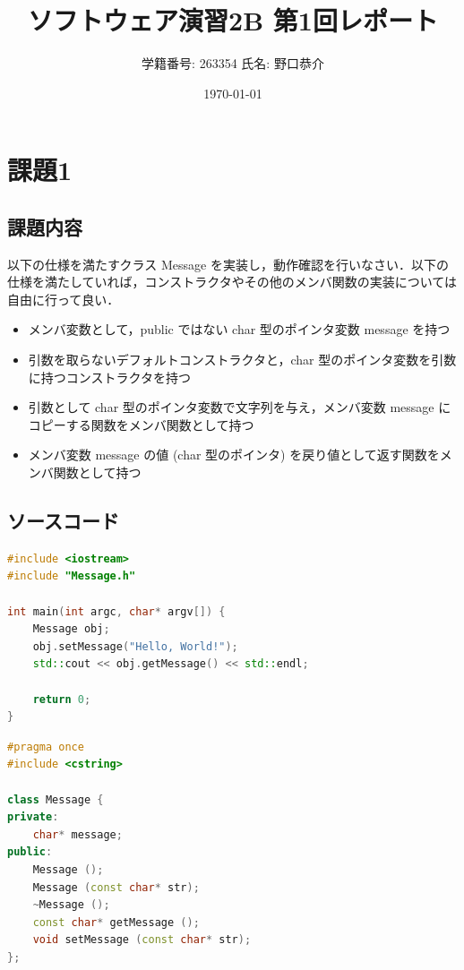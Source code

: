 \documentclass[paper=a4,fontsize=11pt]{jlreq}
\title{ソフトウェア演習2B 第1回レポート}
\author{学籍番号: 263354 \quad 氏名: 野口恭介}
\date{\today}
\begin{document}
\maketitle

\section{課題1}
\subsection{課題内容}
以下の仕様を満たすクラス Message を実装し，動作確認を行いなさい．以下の仕様を満たしていれば，コンストラクタやその他のメンバ関数の実装については自由に行って良い． %

\begin{itemize}
    \item メンバ変数として，public ではない char 型のポインタ変数 message を持つ %
    \item 引数を取らないデフォルトコンストラクタと，char 型のポインタ変数を引数に持つコンストラクタを持つ %
    \item 引数として char 型のポインタ変数で文字列を与え，メンバ変数 message にコピーする関数をメンバ関数として持つ %
    \item メンバ変数 message の値 (char 型のポインタ) を戻り値として返す関数をメンバ関数として持つ %
\end{itemize}

\subsection{ソースコード}
\begin{lstlisting}[caption={課題1のmain.cpp}, language=C++, label={lst:課題1のmain.cpp}]
#include <iostream>
#include "Message.h"

int main(int argc, char* argv[]) {
    Message obj;
    obj.setMessage("Hello, World!");
    std::cout << obj.getMessage() << std::endl;

    return 0;
}
\end{lstlisting}

\begin{lstlisting}[caption={課題1のMessage.h}, language=C++, label={lst:課題1のMessage.h}]
#pragma once
#include <cstring>

class Message {
private:
    char* message;
public:
    Message ();
    Message (const char* str);
    ~Message ();
    const char* getMessage ();
    void setMessage (const char* str);
};
\end{lstlisting}
\end{document}
